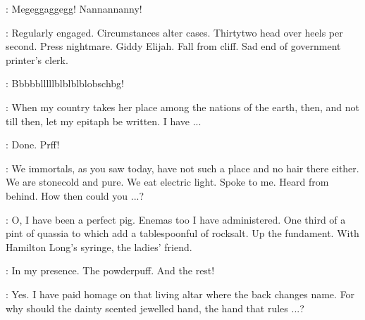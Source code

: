 
\Nannygoat:
Megeggaggegg!
Nannannanny!

\Bloom:
Regularly engaged.
Circumstances alter cases.
Thirtytwo head over heels per second.
Press nightmare.
Giddy Elijah.
Fall from cliff.
Sad end of government printer's clerk.


\Dummymummy:
Bbbbblllllblblblblobschbg!


\CouncillorNannetii:
When my country takes her place among the nations of the earth,
then, and not till then, let my epitaph be written.
I have ...

\Bloom:
Done.
Prff!

\Nymph:
We immortals, as you saw today,
have not such a place and no hair there either.
We are stonecold and pure.
We eat electric light.
Spoke to me.
Heard from behind.
How then could you ...?

\Bloom:
O, I have been a perfect pig.
Enemas too I have administered.
One third of a pint of quassia to which add a tablespoonful of rocksalt.
Up the fundament.
With Hamilton Long's syringe, the ladies' friend.%

\Nymph:
In my presence.
The powderpuff.
And the rest!

\Bloom:
Yes.
I have paid homage on that living altar where the back changes name.
For why should the dainty scented jewelled hand, the hand that rules ...?


